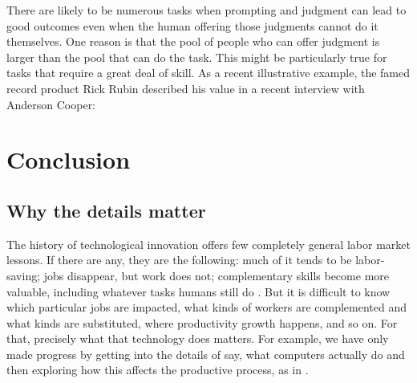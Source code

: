 \documentclass{article}
\begin{document}
There are likely to be numerous tasks when prompting and judgment can lead to good outcomes even when the human offering those judgments cannot do it themselves.
One reason is that the pool of people who can offer judgment is larger than the pool that can do the task. 
This might be particularly true for tasks that require a great deal of skill.
As a recent illustrative example,  the famed record product Rick Rubin described his value in a recent interview with Anderson Cooper:

\section{Conclusion}

\subsection{Why the details matter}
The history of technological innovation offers few completely general labor market lessons.
If there are any, they are the following: much of it tends to be labor-saving; jobs disappear, but work does not; complementary skills become more valuable, including whatever tasks humans still do \citep{autor2015there}. 
But it is difficult to know which particular jobs are impacted, what kinds of workers are complemented and what kinds are substituted, where productivity growth happens, and so on. 
For that, precisely what that technology does matters. 
For example, we have only made progress by getting into the details of say, what computers actually do and then exploring how this affects the productive process, as in \citep{autor2003skill}. 





\end{document}
